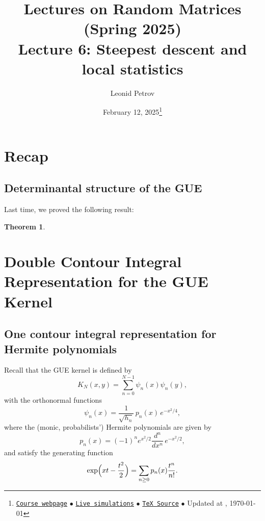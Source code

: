 \documentclass[letterpaper,11pt,oneside,reqno]{article}
\numberwithin{equation}{section}
\newtheorem{theorem}[proposition]{Theorem}
\theoremstyle{definition}
\begin{document}
\title{Lectures on Random Matrices
(Spring 2025)
\\Lecture 6: Steepest descent and local statistics}

\date{February 12, 2025\footnote{\href{https://lpetrov.cc/rmt25/}{\texttt{Course webpage}}
$\bullet$ \href{https://lpetrov.cc/simulations/model/random-matrices/}{\texttt{Live simulations}}
$\bullet$ \href{https://lpetrov.cc/rmt25/rmt25-notes/rmt2025-l06.tex}{\texttt{TeX Source}}
$\bullet$
Updated at \currenttime, \today}}



\author{Leonid Petrov}


\maketitle


\section{Recap}

\subsection{Determinantal structure of the GUE}

Last time, we proved the following result:
\begin{theorem}
\label{thm:determinantal_GUE}
\end{theorem}













\section{Double Contour Integral Representation for the GUE Kernel}
\label{sec:double-contour}

\subsection{One contour integral representation for Hermite polynomials}

Recall that the GUE kernel is defined by
\[
K_N(x,y)=\sum_{n=0}^{N-1}\psi_n(x)\psi_n(y),
\]
with the orthonormal functions
\[
\psi_n(x)=\frac{1}{\sqrt{h_n}}\,p_n(x)\,e^{-x^2/4},
\]
where the (monic, probabilists') Hermite polynomials are given by
\[
p_n(x)=(-1)^n e^{x^2/2}\frac{d^n}{dx^n}\,e^{-x^2/2},
\]
and satisfy the generating function
\[
\exp\Bigl(xt-\frac{t^2}{2}\Bigr)=\sum_{n\ge0}p_n(x)\frac{t^n}{n!}.
\]
\end{document}
